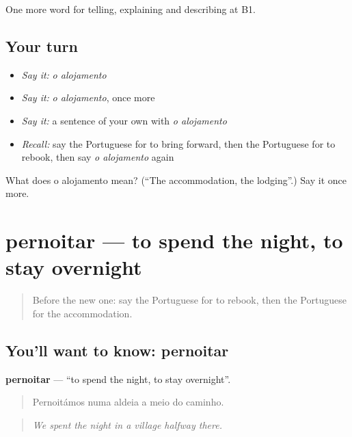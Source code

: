 \begin{grammarlens}[title={What you've built}]
One more word for telling, explaining and describing at B1.
\end{grammarlens}

\subsection*{Your turn}
\begin{itemize}
\raggedright
  \item \emph{Say it:} \emph{o alojamento}
  \item \emph{Say it:} \emph{o alojamento}, once more
  \item \emph{Say it:} a sentence of your own with \emph{o alojamento}
  \item \emph{Recall:} say the Portuguese for to bring forward, then the Portuguese for to rebook, then say \emph{o alojamento} again
\end{itemize}

\begin{tcolorbox}[breakable,colback=teal!4,colframe=teal!35!black,title={Before you move on}]
What does o alojamento mean? (\textquotedblleft{}The accommodation, the lodging\textquotedblright{}.) Say it once more.
\end{tcolorbox}
\section[pernoitar]{pernoitar — to spend the night, to stay overnight}

\label{lesson:PT-C428-pernoitar}



\begin{quote}
Before the new one: say the Portuguese for to rebook, then the Portuguese for the accommodation.
\end{quote}

\subsection*{You'll want to know: pernoitar}
\textbf{pernoitar} — \textquotedblleft{}to spend the night, to stay overnight\textquotedblright{}.

\begin{quote}
Pernoitámos numa aldeia a meio do caminho.
\end{quote}

\begin{quote}
\emph{We spent the night in a village halfway there.}
\end{quote}


